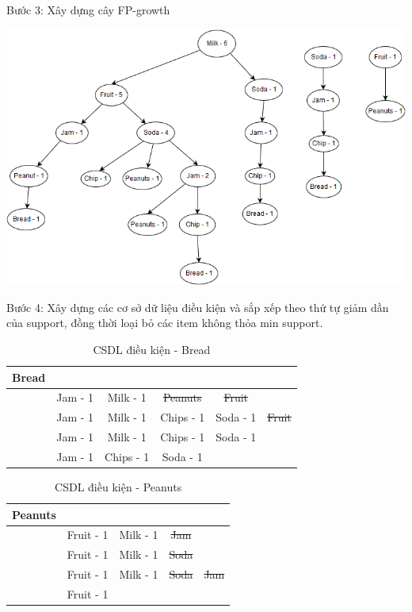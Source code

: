 \documentclass{article}
\begin{document}
\begin{flushleft}
Bước 3: Xây dựng cây FP-growth\\ 
\begin{center}
\includegraphics[scale = 0.5]{Tree.png}
\end{center}
Bước 4: Xây dựng các cơ sở dữ liệu điều kiện và sắp xếp theo thứ tự giảm dần của support, đồng thời loại bỏ các item không thỏa min support.
\begin{table}[H]
	\centering	
	\caption{CSDL điều kiện - Bread}
	\begin{tabular}{|c | c | c | c | c | c |}
		\hline
		Bread & & & & &\\ \hline
		& Jam - 1 & Milk - 1 & \st{Peanuts} & \st{Fruit} & \\ \hline
		& Jam - 1 & Milk - 1 & Chips - 1 & Soda - 1 & \st{Fruit}\\ \hline
		& Jam - 1 & Milk - 1 & Chips - 1 & Soda - 1 & \\ \hline
		& Jam - 1 & Chips - 1 & Soda - 1 & & \\ \hline
	\end{tabular}
\end{table}
\begin{table}[H]
	\begin{minipage}[t]{0.5\linewidth}
		\centering
		\caption{CSDL điều kiện - Peanuts}
		\begin{tabular}{| c | c | c | c | c |}
			\hline
			Peanuts &&&& \\ \hline
			& Fruit - 1 & Milk - 1 & \st{Jam} & \\ \hline
			& Fruit - 1 & Milk - 1 & \st{Soda} & \\ \hline
			& Fruit - 1 & Milk - 1 & \st{Soda} & \st{Jam} \\ \hline
			& Fruit - 1 &&& \\ \hline

\end{tabular}
\end{minipage}
\end{table}
\end{flushleft}
\end{document}
